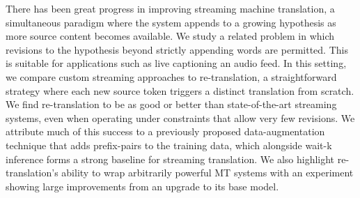 There has been great progress in improving streaming machine translation, a simultaneous paradigm where the system appends to a growing hypothesis as more source content becomes available. We study a related problem in which revisions to the hypothesis beyond strictly appending words are permitted. This is suitable for applications such as live captioning an audio feed. In this setting, we compare custom streaming approaches to re-translation, a straightforward strategy where each new source token triggers a distinct translation from scratch. We find re-translation to be as good or better than state-of-the-art streaming systems, even when operating under constraints that allow very few revisions. We attribute much of this success to a previously proposed data-augmentation technique that adds prefix-pairs to the training data, which alongside wait-k inference forms a strong baseline for streaming translation. We also highlight re-translation's ability to wrap arbitrarily powerful MT systems with an experiment showing large improvements from an upgrade to its base model.
